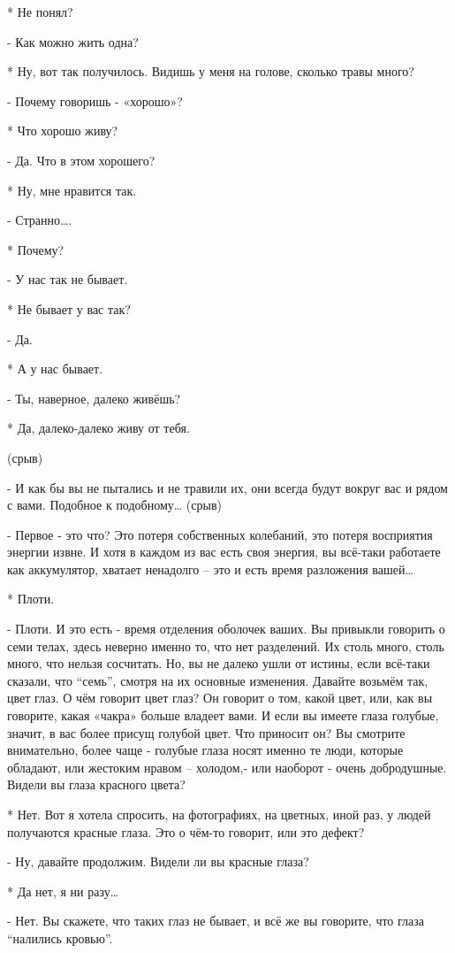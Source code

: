 * Не понял?

- Как можно жить одна?

* Ну, вот так получилось. Видишь у меня на голове, сколько травы много?

- Почему говоришь -  «хорошо»?

* Что хорошо живу?

- Да. Что в этом хорошего?

* Ну, мне нравится так.

- Странно….

* Почему?

- У нас так не бывает.

* Не бывает у вас так?

- Да.

* А у нас бывает.

- Ты, наверное, далеко живёшь?

* Да, далеко-далеко живу от тебя.

 (срыв)

- И как бы вы не пытались и не травили их, они всегда будут вокруг вас и рядом с вами. Подобное к подобному… 
(срыв)

-  Первое - это что? Это потеря собственных колебаний, это потеря восприятия энергии извне. И хотя в каждом из вас есть своя энергия, вы всё-таки работаете как аккумулятор, хватает ненадолго – это и есть время разложения вашей…

* Плоти.

- Плоти. И это есть - время отделения оболочек ваших. Вы привыкли говорить о семи телах, здесь неверно именно то, что нет разделений. Их столь много, столь много, что нельзя сосчитать. Но, вы не далеко ушли от истины, если всё-таки сказали, что “семь”,  смотря на их основные изменения. Давайте возьмём так, цвет глаз. О чём говорит цвет глаз? Он говорит о том, какой цвет, или, как вы говорите, какая «чакра» больше владеет вами. И если вы имеете глаза голубые, значит, в вас более  присущ голубой цвет. Что приносит он? Вы смотрите внимательно, более чаще - голубые глаза носят именно те люди, которые обладают, или жестоким нравом – холодом,- или наоборот - очень добродушные. Видели вы глаза красного цвета?

* Нет. Вот я хотела спросить, на фотографиях, на цветных, иной раз, у людей получаются красные глаза. Это о чём-то говорит, или это дефект?

- Ну, давайте продолжим. Видели ли вы красные глаза?

* Да нет, я ни разу…

- Нет. Вы скажете, что таких глаз не бывает, и всё же вы говорите, что глаза “налились кровью”.

